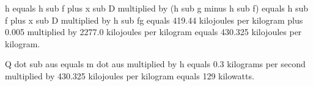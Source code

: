 h equals h sub f plus x sub D multiplied by (h sub g minus h sub f) equals h sub f plus x sub D multiplied by h sub fg equals 419.44 kilojoules per kilogram plus 0.005 multiplied by 2277.0 kilojoules per kilogram equals 430.325 kilojoules per kilogram.  

Q dot sub aus equals m dot aus multiplied by h equals 0.3 kilograms per second multiplied by 430.325 kilojoules per kilogram equals 129 kilowatts.